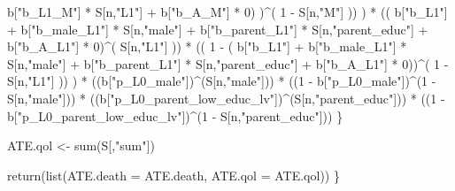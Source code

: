 \documentclass[
]{book}
\newenvironment{Shaded}{\begin{snugshade}}{\end{snugshade}}
\newcommand{\AttributeTok}[1]{\textcolor[rgb]{0.77,0.63,0.00}{#1}}
\newcommand{\DecValTok}[1]{\textcolor[rgb]{0.00,0.00,0.81}{#1}}
\newcommand{\FunctionTok}[1]{\textcolor[rgb]{0.00,0.00,0.00}{#1}}
\newcommand{\NormalTok}[1]{#1}
\newcommand{\OtherTok}[1]{\textcolor[rgb]{0.56,0.35,0.01}{#1}}
\newcommand{\SpecialCharTok}[1]{\textcolor[rgb]{0.00,0.00,0.00}{#1}}
\newcommand{\StringTok}[1]{\textcolor[rgb]{0.31,0.60,0.02}{#1}}
\begin{document}
\begin{Shaded}
\begin{Highlighting}[]
\NormalTok{                                    b[}\StringTok{"b\_L1\_M"}\NormalTok{] }\SpecialCharTok{*}\NormalTok{ S[n,}\StringTok{"L1"}\NormalTok{] }\SpecialCharTok{+}
\NormalTok{                                    b[}\StringTok{"b\_A\_M"}\NormalTok{] }\SpecialCharTok{*} \DecValTok{0}\NormalTok{) )}\SpecialCharTok{\^{}}\NormalTok{( }\DecValTok{1} \SpecialCharTok{{-}}\NormalTok{ S[n,}\StringTok{"M"}\NormalTok{] )) ) }\SpecialCharTok{*}
\NormalTok{                        (( b[}\StringTok{"b\_L1"}\NormalTok{] }\SpecialCharTok{+}
\NormalTok{                             b[}\StringTok{"b\_male\_L1"}\NormalTok{] }\SpecialCharTok{*}\NormalTok{ S[n,}\StringTok{"male"}\NormalTok{] }\SpecialCharTok{+}  
\NormalTok{                             b[}\StringTok{"b\_parent\_L1"}\NormalTok{] }\SpecialCharTok{*}\NormalTok{ S[n,}\StringTok{"parent\_educ"}\NormalTok{] }\SpecialCharTok{+}
\NormalTok{                             b[}\StringTok{"b\_A\_L1"}\NormalTok{] }\SpecialCharTok{*} \DecValTok{0}\NormalTok{)}\SpecialCharTok{\^{}}\NormalTok{( S[n,}\StringTok{"L1"}\NormalTok{] )) }\SpecialCharTok{*}
\NormalTok{                        (( }\DecValTok{1} \SpecialCharTok{{-}}\NormalTok{ ( b[}\StringTok{"b\_L1"}\NormalTok{] }\SpecialCharTok{+}
\NormalTok{                                   b[}\StringTok{"b\_male\_L1"}\NormalTok{] }\SpecialCharTok{*}\NormalTok{ S[n,}\StringTok{"male"}\NormalTok{] }\SpecialCharTok{+}  
\NormalTok{                                   b[}\StringTok{"b\_parent\_L1"}\NormalTok{] }\SpecialCharTok{*}\NormalTok{ S[n,}\StringTok{"parent\_educ"}\NormalTok{] }\SpecialCharTok{+}
\NormalTok{                                   b[}\StringTok{"b\_A\_L1"}\NormalTok{] }\SpecialCharTok{*} \DecValTok{0}\NormalTok{))}\SpecialCharTok{\^{}}\NormalTok{( }\DecValTok{1} \SpecialCharTok{{-}}\NormalTok{ S[n,}\StringTok{"L1"}\NormalTok{] )) ) }\SpecialCharTok{*}
\NormalTok{      ((b[}\StringTok{"p\_L0\_male"}\NormalTok{])}\SpecialCharTok{\^{}}\NormalTok{(S[n,}\StringTok{"male"}\NormalTok{])) }\SpecialCharTok{*} 
\NormalTok{      ((}\DecValTok{1} \SpecialCharTok{{-}}\NormalTok{ b[}\StringTok{"p\_L0\_male"}\NormalTok{])}\SpecialCharTok{\^{}}\NormalTok{(}\DecValTok{1} \SpecialCharTok{{-}}\NormalTok{ S[n,}\StringTok{"male"}\NormalTok{])) }\SpecialCharTok{*} 
\NormalTok{      ((b[}\StringTok{"p\_L0\_parent\_low\_educ\_lv"}\NormalTok{])}\SpecialCharTok{\^{}}\NormalTok{(S[n,}\StringTok{"parent\_educ"}\NormalTok{])) }\SpecialCharTok{*}
\NormalTok{      ((}\DecValTok{1} \SpecialCharTok{{-}}\NormalTok{ b[}\StringTok{"p\_L0\_parent\_low\_educ\_lv"}\NormalTok{])}\SpecialCharTok{\^{}}\NormalTok{(}\DecValTok{1} \SpecialCharTok{{-}}\NormalTok{ S[n,}\StringTok{"parent\_educ"}\NormalTok{])) }
\NormalTok{    \}}
  
\NormalTok{  ATE.qol }\OtherTok{\textless{}{-}} \FunctionTok{sum}\NormalTok{(S[,}\StringTok{"sum"}\NormalTok{])}
  
  \FunctionTok{return}\NormalTok{(}\FunctionTok{list}\NormalTok{(}\AttributeTok{ATE.death =}\NormalTok{ ATE.death, }\AttributeTok{ATE.qol =}\NormalTok{ ATE.qol))}
\NormalTok{\}}
\end{Highlighting}
\end{Shaded}
\end{document}
